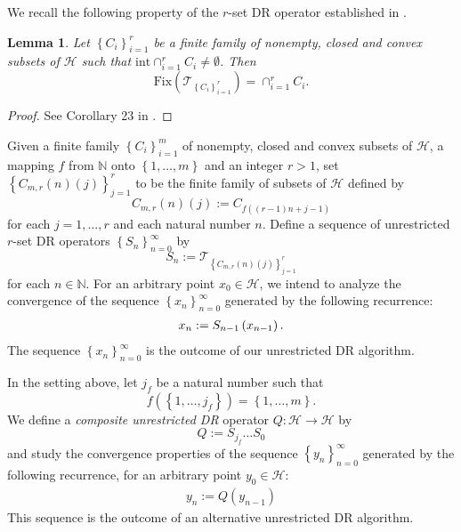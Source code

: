 \documentclass[]{interact}
\theoremstyle{plain}%
\newtheorem{lemma}[theorem]{Lemma}
\theoremstyle{definition}
\theoremstyle{remark}
\begin{document}
We recall the following property of the $r$-set DR operator established
in \cite{key-15}.
\begin{lemma}
\label{Fix r-sets operator}Let $\left\{ C_{i}\right\} _{i=1}^{r}$
be a finite family of nonempty, closed and convex subsets of $\mathcal{H}$
such that $\mathrm{int}\cap_{i=1}^{r}C_{i}\not=\emptyset$. Then
\[
\mathrm{Fix}\left(\mathcal{T}_{\left\{ C_{i}\right\} _{i=1}^{r}}\right)=\cap_{i=1}^{r}C_{i}.
\]
\end{lemma}
\begin{proof}
See Corollary 23 in \cite{key-15}.
\end{proof}
Given a finite family $\left\{ C_{i}\right\} _{i=1}^{m}$ of nonempty,
closed and convex subsets of $\mathcal{H}$, a mapping $f$ from $\mathbb{N}$
onto $\left\{ 1,\dots,m\right\} $ and an integer $r>1$, set $\left\{ C_{m,r}\left(n\right)\left(j\right)\right\} _{j=1}^{r}$
to be the finite family of subsets of $\mathcal{H}$ defined by
\begin{equation}
C_{m,r}\left(n\right)\left(j\right):=C_{f\left(\left(r-1\right)n+j-1\right)}\label{eq:-5}
\end{equation}
for each $j=1,\dots,r$ and each natural number $n$. Define a sequence
of \color{black}unrestricted \color{black} $r$-set DR operators $\left\{ S_{n}\right\} _{n=0}^{\infty}$
by
\begin{equation}
S_{n}:=\mathcal{T}_{\left\{ C_{m,r}\left(n\right)\left(j\right)\right\} _{j=1}^{r}}\label{eq:-3}
\end{equation}
\color{black}for each $n\in \mathbb{N}$. \color{black}For an arbitrary point $x_{0}\in\mathcal{H}$, we intend to analyze
the convergence of the sequence $\left\{ x_{n}\right\} _{n=0}^{\infty}$
generated by the following recurrence:
\begin{gather}
\color{black}x_{n}:=S_{n-1}\left(x_{n-1}\right)\label{eq:}.\color{black}
\end{gather}
The sequence $\left\{ x_{n}\right\} _{n=0}^{\infty}$ is the outcome
of our \color{black}unrestricted \color{black} DR algorithm.

In the setting above, let $j_{f}$ be a natural number such that
\begin{equation}
f\left(\left\{ 1,\dots,j_{f}\right\} \right)=\left\{ 1,\dots,m\right\} .\label{eq:-8}
\end{equation}
We define a \textit{composite \color{black}unrestricted \color{black} DR} operator $Q:\mathcal{H}\rightarrow\mathcal{H}$
by
\begin{equation}
Q:=S_{j_{f}}\dots S_{0}\label{eq:-4}
\end{equation}
and study the convergence properties of the sequence $\left\{ y_{n}\right\} _{n=0}^{\infty}$
generated by the following recurrence, for an arbitrary point $y_{0}\in\mathcal{H}$:
\begin{gather}
y_{n}:=Q\left(y_{n-1}\right)\label{eq:-1}
\end{gather}
This sequence is the
outcome of an alternative \color{black}unrestricted \color{black} DR algorithm.
\end{document}
